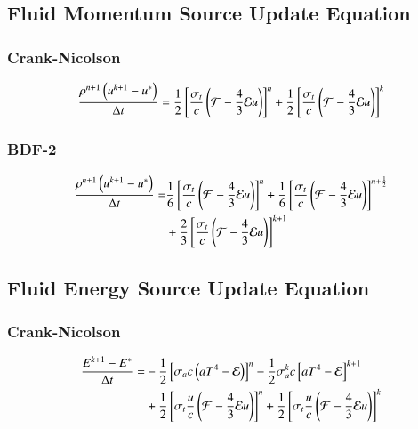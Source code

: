 \documentclass[preprint,12pt]{elsarticle}
\begin{document}
\subsection{Fluid Momentum Source Update Equation}
\subsubsection{Crank-Nicolson}
\begin{equation}
  \frac{\rho^{n+1}\left(u^{k+1}-u^*\right)}{\Delta t} = 
   \frac{1}{2}\left[\frac{\sigma_{t}}{c}\left(\mathcal{F}-\frac{4}{3}\mathcal{E} u\right)\right]^n
  +\frac{1}{2}\left[\frac{\sigma_{t}}{c}\left(\mathcal{F}-\frac{4}{3}\mathcal{E} u\right)\right]^k
\end{equation}

\subsubsection{BDF-2}
\begin{equation}\begin{split}
  \frac{\rho^{n+1}\left(u^{k+1}-u^*\right)}{\Delta t} =  
  & \frac{1}{6}\left[\frac{\sigma_{t}}{c}\left(\mathcal{F}-\frac{4}{3}\mathcal{E} u\right)\right]^n
   +\frac{1}{6}\left[\frac{\sigma_{t}}{c}\left(\mathcal{F}-\frac{4}{3}\mathcal{E} u\right)\right]^{n+\frac{1}{2}}\\
  &+\frac{2}{3}\left[\frac{\sigma_{t}}{c}\left(\mathcal{F}-\frac{4}{3}\mathcal{E} u\right)\right]^{k+1}
\end{split}\end{equation}

\subsection{Fluid Energy Source Update Equation}
\subsubsection{Crank-Nicolson}
\begin{equation}\begin{split}
  \frac{E^{k+1}-E^*}{\Delta t} = &
  -\frac{1}{2}\left[\sigma_{a} c\left(aT^4 - \mathcal{E}\right)\right]^n
  -\frac{1}{2}\sigma_{a}^k c\left[aT^4 - \mathcal{E}\right]^{k+1}\\
  &+\frac{1}{2}\left[\sigma_{t}\frac{u}{c}\left(\mathcal{F}-\frac{4}{3}\mathcal{E} u\right)\right]^n
   +\frac{1}{2}\left[\sigma_t\frac{u}{c}\left(\mathcal{F}-\frac{4}{3}\mathcal{E} u\right)\right]^k
\end{split}\end{equation}
\end{document}
